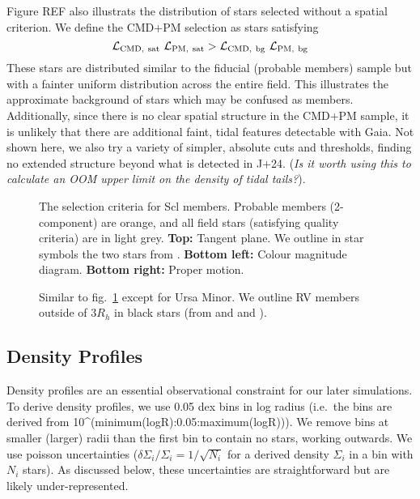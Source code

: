 Figure REF also illustrats the distribution of stars selected without a
spatial criterion. We define the CMD+PM selection as stars satisfying \[
{\cal L}_{\rm CMD,\ sat}\ {\cal L}_{\rm PM,\ sat} > {\cal L}_{\rm CMD,\ bg}\ {\cal L}_{\rm PM,\ bg}
\] These stars are distributed similar to the fiducial (probable
members) sample but with a fainter uniform distribution across the
entire field. This illustrates the approximate background of stars which
may be confused as members. Additionally, since there is no clear
spatial structure in the CMD+PM sample, it is unlikely that there are
additional faint, tidal features detectable with Gaia. Not shown here,
we also try a variety of simpler, absolute cuts and thresholds, finding
no extended structure beyond what is detected in J+24. (\emph{Is it
worth using this to calculate an OOM upper limit on the density of tidal
tails?}).

\begin{figure}
\centering
{}
\caption[Sculptor selection criteria]{The selection criteria for Scl
members. Probable members (2-component) are orange, and all field stars
(satisfying quality criteria) are in light grey. \textbf{Top:} Tangent
plane. We outline in star symbols the two stars from
\citet{sestito+2023a}. \textbf{Bottom left:} Colour magnitude diagram.
\textbf{Bottom right:} Proper motion.}\label{fig:sculptor_selection}
\end{figure}

\begin{figure}
\centering
{}
\caption[Ursa Minor Selection]{Similar to
fig.~\ref{fig:sculptor_selection} except for Ursa Minor. We outline RV
members outside of \(3R_h\) in black stars (from \citet{sestito+2023b}
and \citet{pace+2020} and
\citet{spencer+2018}).}\label{fig:umi_selection}
\end{figure}

\subsection{Density Profiles}\label{density-profiles}

Density profiles are an essential observational constraint for our later
simulations. To derive density profiles, we use 0.05 dex bins in log
radius (i.e.~the bins are derived from
10\^{}(minimum(logR):0.05:maximum(logR))). We remove bins at smaller
(larger) radii than the first bin to contain no stars, working outwards.
We use poisson uncertainties
(\(\delta \Sigma_i / \Sigma_i = 1/\sqrt{N_i}\) for a derived density
\(\Sigma_i\) in a bin with \(N_i\) stars). As discussed below, these
uncertainties are straightforward but are likely under-represented.

